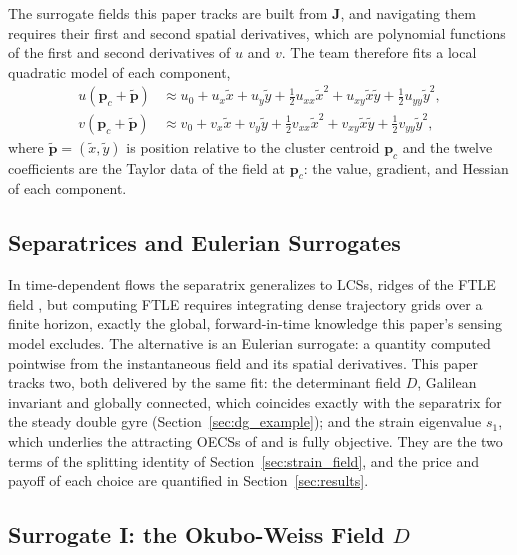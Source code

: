 \documentclass[lettersize,journal]{IEEEtran}
\begin{document}
The surrogate fields this paper tracks are built from $\mathbf{J}$, and
navigating them requires their first and second spatial derivatives,
which are polynomial functions of the first and second derivatives of
$u$ and $v$. The team therefore fits a local quadratic model of each
component,
\begin{align}
    u(\mathbf{p}_c + \tilde{\mathbf{p}}) &\approx u_0 + u_x \tilde{x}
        + u_y \tilde{y} + \tfrac{1}{2} u_{xx} \tilde{x}^2
        + u_{xy} \tilde{x}\tilde{y} + \tfrac{1}{2} u_{yy} \tilde{y}^2,
        \label{eq:quad_model_u} \\
    v(\mathbf{p}_c + \tilde{\mathbf{p}}) &\approx v_0 + v_x \tilde{x}
        + v_y \tilde{y} + \tfrac{1}{2} v_{xx} \tilde{x}^2
        + v_{xy} \tilde{x}\tilde{y} + \tfrac{1}{2} v_{yy} \tilde{y}^2,
        \label{eq:quad_model_v}
\end{align}
where $\tilde{\mathbf{p}} = (\tilde{x}, \tilde{y})$ is position relative to
the cluster centroid $\mathbf{p}_c$ and the twelve coefficients are the
Taylor data of the field at $\mathbf{p}_c$: the value, gradient, and
Hessian of each component. 

\subsection{Separatrices and Eulerian Surrogates}
\label{sec:separatrix}

In time-dependent flows the separatrix generalizes to LCSs, ridges of
the FTLE field \cite{6,7,8}, but computing FTLE requires integrating
dense trajectory grids over a finite horizon, exactly the global,
forward-in-time knowledge this paper's sensing model excludes. The
alternative is an Eulerian surrogate: a quantity computed pointwise
from the instantaneous field and its spatial derivatives. This paper
tracks two, both delivered by the same fit: the determinant field $D$,
Galilean invariant and globally connected, which coincides exactly with
the separatrix for the steady double gyre
(Section~\ref{sec:dg_example}); and the strain eigenvalue $s_1$, which
underlies the attracting OECSs of \cite{17,18} and is fully objective.
They are the two terms of the splitting identity of
Section~\ref{sec:strain_field}, and the price and payoff of each choice
are quantified in Section~\ref{sec:results}.

\subsection{Surrogate I: the Okubo-Weiss Field $D$}
\end{document}

